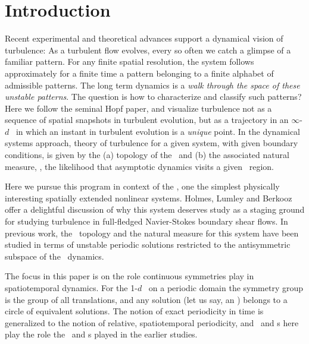  

\section{Introduction}

Recent experimental and theoretical advances
support a dynamical vision of turbulence:
As a turbulent flow evolves,
every so often we catch a glimpse of a familiar pattern.
For any finite  spatial resolution,
the system follows approximately for a finite time 
a pattern belonging to a 
{ finite alphabet}
of admissible patterns.
The long term dynamics is
a {\em walk through the space of these unstable patterns}.
The question is how to characterize and classify such patterns?
Here we follow the seminal Hopf paper, and  visualize
turbulence not as  a sequence of 
spatial snapshots in turbulent evolution,
but as a trajectory in an 
 $\infty$-$d$ \statesp\ in which an
instant in turbulent evolution is
a {\em unique} point. In the dynamical systems approach,  
theory of turbulence for a given system, with given boundary conditions,
is given by the
(a) topology of the \statesp\ and (b) the associated natural measure, 
\ie,
the likelihood that asymptotic dynamics visits a given \statesp\ region.

Here we pursue this program in context of
the \KSe, %
one the
simplest physically interesting spatially extended nonlinear systems.
Holmes, Lumley
and Berkooz offer a delightful discussion of why this system
deserves study as a staging ground for studying turbulence in 
full-fledged Navier-Stokes boundary shear flows. 
In previous work,
the \statesp\ topology and the natural measure for
this system have been studied
in terms of unstable periodic solutions
restricted to
the antisymmetric subspace of the \KS\ dynamics.

The focus in this paper is on the role continuous symmetries
play in spatiotemporal dynamics. For the 1-$d$ \KS\ on a periodic domain
the symmetry group is the group of all translations, and
any solution (let us say, an \eqv ) belongs to a circle of equivalent
solutions. The notion of exact periodicity in time is 
generalized to the notion of relative, spatiotemporal periodicity, and
\reqva\ and \rpo s here play the role the \eqva\ and
\po s played in the earlier studies. 

